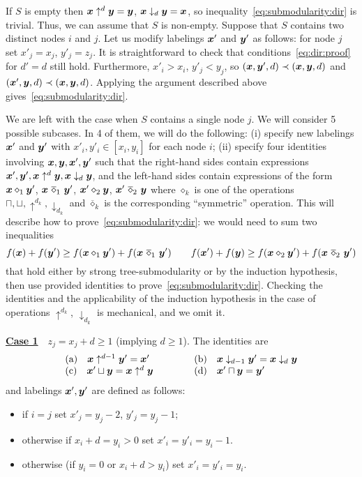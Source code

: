 \documentclass[11pt,onecolumn]{article}
\newcommand{\bx}{\mbox{\boldmath $x$}}
\newcommand{\by}{\mbox{\boldmath $y$}}
\begin{document}
If $S$ is empty then $\bx\uparrow^d \by=\by$, $\bx\downarrow_d \by=\bx$, so inequality~\eqref{eq:submodularity:dir}
is trivial. Thus, we can assume that $S$ is non-empty.
Suppose that $S$ contains two distinct nodes $i$ and $j$. Let us modify labelings $\bx'$ and $\by'$ as follows:
for node $j$ set $x'_j=x_j$, $y'_j=z_j$. It is straightforward to check that conditions~\eqref{eq:dir:proof} for $d'=d$
still hold. Furthermore, $x'_i>x_i$, $y'_j<y_j$, so $(\bx,\by',d)\prec (\bx,\by,d)$ and $(\bx',\by,d)\prec (\bx,\by,d)$.
Applying the argument described above gives~\eqref{eq:submodularity:dir}.

We are left with the case when $S$ contains a single node $j$. 
We will consider 5 possible subcases.
In 4 of them, we will do the following: (i) specify new labelings $\bx'$ and $\by'$ with $x'_i,y'_i\in[x_i,y_i]$ for each node $i$;
(ii) specify four identities involving $\bx,\by,\bx',\by'$ such that the right-hand sides contain expressions $\bx',\by',\bx\uparrow^d \by,\bx\downarrow_d\by$,
 and the left-hand sides contain expressions of the form 
$\bx \diamond_1 \by'$, $\bx ~\overline\diamond_1~ \by'$, 
$\bx' \diamond_2 \by$, $\bx' ~\overline\diamond_2~ \by$ 
where $\diamond_k$ is one of the operations $\sqcap,\sqcup,\uparrow^{d_k},\downarrow_{d_k}$
and $\overline\diamond_k$ is the corresponding ``symmetric'' operation. This will describe how to prove~\eqref{eq:submodularity:dir}:
we would need to sum two inequalities
$$
f(\bx)+f(\by')\ge f(\bx \diamond_1 \by')+f(\bx ~\overline\diamond_1~ \by') \qquad
f(\bx')+f(\by)\ge f(\bx \diamond_2 \by')+f(\bx ~\overline\diamond_2~ \by')
$$
that hold either by strong tree-submodularity or by the induction hypothesis, then use provided identities to prove~\eqref{eq:submodularity:dir}.
Checking the identities and the applicability of the induction hypothesis in the case of operations $\uparrow^{d_k}$, $\downarrow_{d_k}$
is mechanical, and we omit it.

\vspace{3pt}
\noindent \underline{\bf Case 1}~~$z_j=x_j+d\ge 1$ (implying $d \ge 1$). The identities are
\begin{equation}
\begin{tabular}{ll}
(a)$\quad \bx \uparrow^{d-1} \by' =  \bx' $ &
(b)$\quad \bx \downarrow_{d-1} \by' = \bx \downarrow_d \by$ \\
(c)$\quad \bx' \sqcup \by = \bx \uparrow^d \by \qquad \quad  $ &
(d)$\quad \bx' \sqcap \by = \by' $ 
\end{tabular}
\end{equation}
and labelings $\bx',\by'$ are defined as follows:
\begin{itemize}
\item if $i=j$ set $x'_j=y_j-2$, $y'_j=y_j-1$; 
\item otherwise if $x_i+d=y_i>0$ set $x'_i=y'_i=y_i-1$.
\item otherwise (if $y_i=0$ or $x_i+d>y_i$) set $x'_i=y'_i=y_i$.
\end{itemize}
\end{document}
